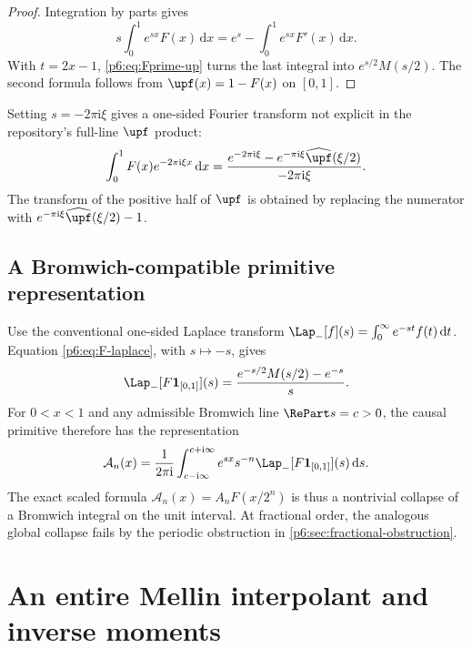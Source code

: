 \documentclass[11pt,oneside]{article}
\theoremstyle{definition}
\theoremstyle{remark}
\newcommand{\dd}{\,\mathrm d}
\newcommand{\ii}{\mathrm i}
\newcommand{\1}{\mathbf 1}
\begin{document}
\begin{proof}
Integration by parts gives
\[
 s\int_0^1e^{sx}F(x)\dd x=e^s-\int_0^1e^{sx}F'(x)\dd x.
\]
With \(t=2x-1\), \eqref{p6:eq:Fprime-up} turns the last integral into
\(e^{s/2}M(s/2)\).  The second formula follows from \(\upf(x)=1-F(x)\) on
\([0,1]\).
\end{proof}

Setting \(s=-2\pi\ii\xi\) gives a one-sided Fourier transform not explicit in the
repository's full-line \(\upf\) product:
\begin{equation}
 \int_0^1F(x)e^{-2\pi\ii\xi x}\dd x
 =\frac{e^{-2\pi\ii\xi}-e^{-\pi\ii\xi}\widehat{\upf}(\xi/2)}
 {-2\pi\ii\xi}.                                          \label{p6:eq:F-fourier-one-sided}
\end{equation}
The transform of the positive half of \(\upf\) is obtained by replacing the numerator
with \(e^{-\pi\ii\xi}\widehat{\upf}(\xi/2)-1\).

\subsection{A Bromwich-compatible primitive representation}

Use the conventional one-sided Laplace transform
\(
 \Lap_-[f](s)=\int_0^\infty e^{-st}f(t)\dd t
\).
Equation \eqref{p6:eq:F-laplace}, with \(s\mapsto-s\), gives
\begin{equation}
 \Lap_-[F\mathbf{1}_{[0,1]}](s)
 =\frac{e^{-s/2}M(s/2)-e^{-s}}{s}.                         \label{p6:eq:F-conventional-Laplace}
\end{equation}
For \(0<x<1\) and any admissible Bromwich line \(\RePart s=c>0\), the causal primitive
therefore has the representation
\begin{equation}
 \mathcal A_n(x)
 =\frac1{2\pi\ii}\int_{c-\ii\infty}^{c+\ii\infty}
   e^{sx}s^{-n}\Lap_-[F\mathbf{1}_{[0,1]}](s)\dd s.         \label{p6:eq:Bromwich-primitive}
\end{equation}
The exact scaled formula \(\mathcal A_n(x)=A_nF(x/2^n)\) is thus a nontrivial collapse
of a Bromwich integral on the unit interval.  At fractional order, the analogous
global collapse fails by the periodic obstruction in \cref{p6:sec:fractional-obstruction}.

\section{An entire Mellin interpolant and inverse moments}
\end{document}
